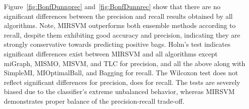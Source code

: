 \documentclass[reqno]{vcuthesis}
\numberwithin{equation}{chapter}
\begin{document}
Figure~\ref{fig:BonfDunnprec} and~\ref{fig:BonfDunnrec} show that there are no significant differences between the precision and recall results obtained by all algorithms. Note, MIRSVM outperforms both ensemble methods according to recall, despite them exhibiting good accuracy and precision, indicating they are strongly conservative towards predicting positive bags. Holm's test indicates significant differences exist between MIRSVM and all algorithms except miGraph, MISMO, MISVM, and TLC for precision, and all the above along with SimpleMI, MIOptimalBall, and Bagging for recall. The Wilcoxon test does not reflect significant differences for precision, does for recall. The tests are severely biased due to the classifier's extreme unbalanced behavior, whereas MIRSVM demonstrates proper balance of the precision-recall trade-off.
\end{document}
